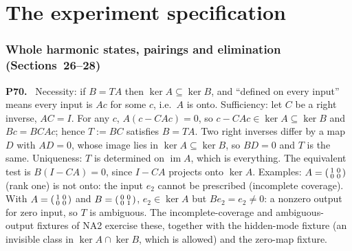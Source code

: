 \documentclass[11pt]{article}
\newenvironment{solution}[1]{\medskip\noindent\textbf{P#1.}\ }{\par\medskip}
\begin{document}
\part*{The experiment specification}

\section*{Whole harmonic states, pairings and elimination (Sections~26--28)}

\begin{solution}{70}
Necessity: if $B = TA$ then $\ker A\subseteq\ker B$, and ``defined on every
input'' means every input is $Ac$ for some $c$, i.e.\ $A$ is onto. Sufficiency:
let $C$ be a right inverse, $AC = I$. For any $c$, $A(c-CAc) = 0$, so
$c-CAc\in\ker A\subseteq\ker B$ and $Bc = BCAc$; hence $T := BC$ satisfies
$B = TA$. Two right inverses differ by a map $D$ with $AD = 0$, whose image
lies in $\ker A\subseteq\ker B$, so $BD = 0$ and $T$ is the same. Uniqueness:
$T$ is determined on $\operatorname{im}A$, which is everything. The
equivalent test is $B(I-CA) = 0$, since $I-CA$ projects onto $\ker A$.
Examples: $A = \begin{psmallmatrix}1&0\\0&0\end{psmallmatrix}$ (rank one) is
not onto: the input $e_2$ cannot be prescribed (incomplete coverage). With
$A = \begin{psmallmatrix}1&0\\0&0\end{psmallmatrix}$ and $B = \begin{psmallmatrix}0&0\\0&1\end{psmallmatrix}$,
$e_2\in\ker A$ but $Be_2 = e_2\ne0$: a nonzero output for zero input, so $T$
is ambiguous. The incomplete-coverage and ambiguous-output fixtures of NA2
exercise these, together with the hidden-mode fixture (an invisible class in
$\ker A\cap\ker B$, which is allowed) and the zero-map fixture.
\end{solution}
\end{document}
